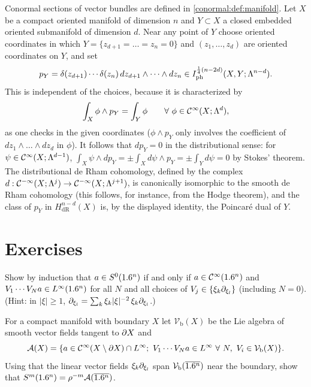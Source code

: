 \begin{example}\label{conormal:ex:poincare}
  Conormal sections of vector bundles are defined in
  \cref{conormal:def:manifold}.  Let $X$ be a compact oriented manifold of
  dimension $n$ and $Y\subset X$ a closed embedded oriented submanifold of
  dimension $d$.  Near any point of $Y$ choose oriented coordinates in which
  $Y=\{z_{d+1}=\dots=z_n=0\}$ and $(z_1,\dots,z_d)$ are oriented coordinates on $Y$,
  and set
  \begin{equation*}
    p_Y=\delta(z_{d+1})\cdots\delta(z_n)\,dz_{d+1}\wedge\dots\wedge dz_n\in
    I^{\frac14(n-2d)}_{\mathrm{ph}}(X,Y;\Lambda^{n-d}).
  \end{equation*}
  This is independent of the choices, because it is characterized by
  \begin{equation*}
    \int_X\phi\wedge p_Y=\int_Y\phi\qquad\forall\ \phi\in\CI(X;\Lambda^d),
  \end{equation*}
  as one checks in the given coordinates ($\phi\wedge p_Y$ only involves the
  coefficient of $dz_1\wedge\dots\wedge dz_d$ in $\phi$).  It follows that
  $dp_Y=0$ in the distributional sense: for $\psi\in\mathcal{C}^\infty(X;\Lambda^{d-1})$,
  $\int_X\psi\wedge dp_Y=\pm\int_Xd\psi\wedge p_Y=\pm\int_Yd\psi=0$ by Stokes'
  theorem.  The distributional de Rham cohomology, defined by the complex
  $d:\mathcal{C}^{-\infty}(X;\Lambda^j)\to\mathcal{C}^{-\infty}(X;\Lambda^{j+1})$, is canonically isomorphic to the
  smooth de Rham cohomology (this follows, for instance, from the Hodge theorem),
  and the class of $p_Y$ in $H^{n-d}_{\mathrm{dR}}(X)$ is, by the displayed
  identity, the Poincar\'e dual of $Y$.
\end{example}

\section{Exercises}\label{conormal:sec:exercises}

\begin{exercise}\label{conormal:ex:Vkl}
  Show by induction that $a\in S^0(1.6^n)$ if and only if $a\in\mathcal{C}^\infty(1.6^n)$ and
  $V_1\cdots V_Na\in L^\infty(1.6^n)$ for all $N$ and all choices of
  $V_j\in\{\xi_k\partial_{\xi_l}\}$ (including $N=0$).  (Hint: in $|\xi|\ge1$,
  $\partial_{\xi_l}=\sum_k\xi_k|\xi|^{-2}\,\xi_k\partial_{\xi_l}$.)
\end{exercise}

\begin{exercise}\label{conormal:ex:Ab}
  For a compact manifold with boundary $X$ let $\mathcal V_{\mathrm b}(X)$ be the
  Lie algebra of smooth vector fields tangent to $\partial X$ and
  \begin{equation*}
    \mathcal A(X)=\{a\in\mathcal{C}^\infty(X\setminus\partial X)\cap L^\infty;\ V_1\cdots V_Na\in
    L^\infty\ \forall\ N,\ V_i\in\mathcal V_{\mathrm b}(X)\}.
  \end{equation*}
  Using that the linear vector fields $\xi_k\partial_{\xi_l}$ span
  $\mathcal V_{\mathrm b}(\overline{1.6^n})$ near the boundary, show that
  $S^m(1.6^n)=\rho^{-m}\mathcal A(\overline{1.6^n})$.
\end{exercise}

